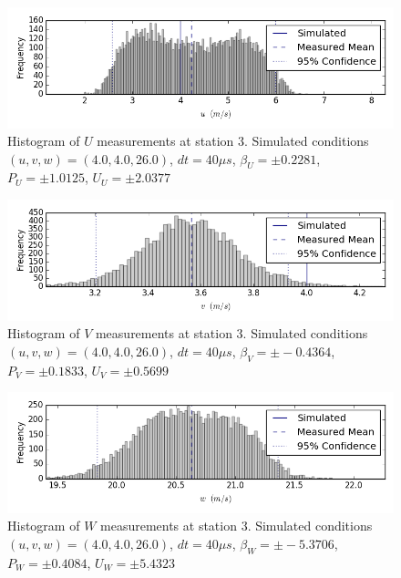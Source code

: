 \begin{figure}[H]
\centering
\includegraphics[width=6in]{figs/Ely_May28th03002/uncertainty_Ely_May28th03002_U}
\caption{Histogram of $U$ measurements at station 3. Simulated conditions $(u,v,w)=(4.0, 4.0, 26.0)$, $dt=40 \mu s$, $\beta_U=\pm 0.2281$, $P_U=\pm 1.0125$, $U_U=\pm 2.0377$}
\label{fig:uncertainty_Ely_May28th03002_U}
\end{figure}


\begin{figure}[H]
\centering
\includegraphics[width=6in]{figs/Ely_May28th03002/uncertainty_Ely_May28th03002_V}
\caption{Histogram of $V$ measurements at station 3. Simulated conditions $(u,v,w)=(4.0, 4.0, 26.0)$, $dt=40 \mu s$, $\beta_V=\pm -0.4364$, $P_V=\pm 0.1833$, $U_V=\pm 0.5699$}
\label{fig:uncertainty_Ely_May28th03002_V}
\end{figure}


\begin{figure}[H]
\centering
\includegraphics[width=6in]{figs/Ely_May28th03002/uncertainty_Ely_May28th03002_W}
\caption{Histogram of $W$ measurements at station 3. Simulated conditions $(u,v,w)=(4.0, 4.0, 26.0)$, $dt=40 \mu s$, $\beta_W=\pm -5.3706$, $P_W=\pm 0.4084$, $U_W=\pm 5.4323$}
\label{fig:uncertainty_Ely_May28th03002_W}
\end{figure}


